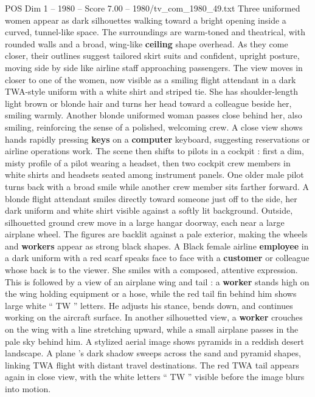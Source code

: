 \begin{textsample}{POS Dim 1 – 1980 – Score 7.00 – 1980/tv\_com\_1980\_49.txt}  \label{ex:f1_pos_059}
Three uniformed women appear as dark silhouettes walking toward a bright opening inside a curved, tunnel-like space.
The surroundings are warm-toned and theatrical, with rounded walls and a broad, wing-like \textbf{ceiling} shape overhead.
As they come closer, their outlines suggest tailored skirt suits and confident, upright posture, moving side by side like airline staff approaching passengers.
The view moves in closer to one of the women, now visible as a smiling flight attendant in a dark TWA-style uniform with a white shirt and striped tie.
She has shoulder-length light brown or blonde hair and turns her head toward a colleague beside her, smiling warmly.
Another blonde uniformed woman passes close behind her, also smiling, reinforcing the sense of a polished, welcoming crew.
A close view shows hands rapidly pressing \textbf{keys} on a \textbf{computer} keyboard, suggesting reservations or airline operations work.
The scene then shifts to pilots in a cockpit : first a dim, misty profile of a pilot wearing a headset, then two cockpit crew members in white shirts and headsets seated among instrument panels.
One older male pilot turns back with a broad smile while another crew member sits farther forward.
A blonde flight attendant smiles directly toward someone just off to the side, her dark uniform and white shirt visible against a softly lit background.
Outside, silhouetted ground crew move in a large hangar doorway, each near a large airplane wheel.
The figures are backlit against a pale exterior, making the wheels and \textbf{workers} appear as strong black shapes.
A Black female airline \textbf{employee} in a dark uniform with a red scarf speaks face to face with a \textbf{customer} or colleague whose back is to the viewer.
She smiles with a composed, attentive expression.
This is followed by a view of an airplane wing and tail : a \textbf{worker} stands high on the wing holding equipment or a hose, while the red tail fin behind him shows large white “ TW ” letters.
He adjusts his stance, bends down, and continues working on the aircraft surface.
In another silhouetted view, a \textbf{worker} crouches on the wing with a line stretching upward, while a small airplane passes in the pale sky behind him.
A stylized aerial image shows pyramids in a reddish desert landscape.
A plane ’s dark shadow sweeps across the sand and pyramid shapes, linking TWA flight with distant travel destinations.
The red TWA tail appears again in close view, with the white letters “ TW ” visible before the image blurs into motion.

\end{textsample}
